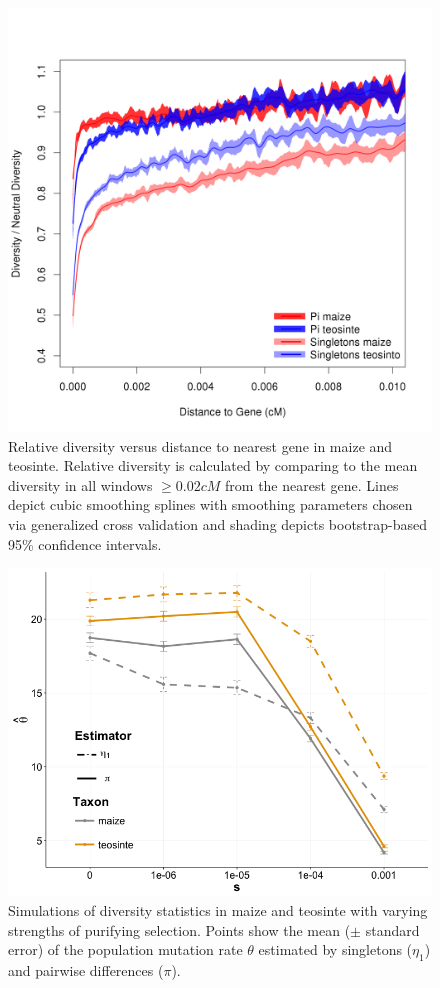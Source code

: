 \begin{figure}
  \includegraphics[width=\textwidth]{FigsAndFiles/distanceToGene_WithSignificance_Folded2_maizeAndTeoSingleVsPi.png}
\caption{ Relative diversity versus distance to nearest gene in maize and teosinte. Relative diversity is calculated by comparing to the mean diversity in all windows $\geq 0.02 cM$ from the nearest gene. Lines depict cubic smoothing splines with smoothing parameters chosen via generalized cross validation and shading depicts bootstrap-based 95\% confidence intervals.  \label{sFig:singletonPi}}
\end{figure}
\clearpage

\begin{figure}
  \includegraphics[width=\textwidth]{FigsAndFiles/jri_sims.png}
\caption{Simulations of diversity statistics in maize and teosinte with varying strengths of purifying selection. Points show the mean ($\pm$ standard error) of the population mutation rate $\theta$ estimated by singletons ($\eta_1$) and pairwise differences ($\pi$). \label{sFig:sims}}
\end{figure}
\clearpage



